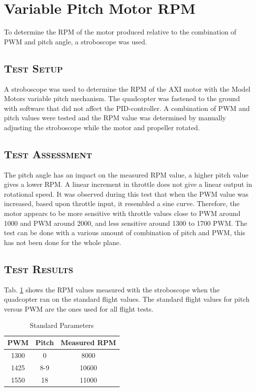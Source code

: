 
\section{Variable Pitch Motor RPM}
To determine the RPM of the motor produced relative to the combination of PWM and pitch angle, a stroboscope was used.

\subsection{\textsc{\medium Test Setup}}
A stroboscope was used to determine the RPM of the AXI motor with the Model Motors variable pitch mechanism. The quadcopter was fastened to the ground with software that did not affect the PID-controller. A combination of PWM and pitch values were tested and the RPM value was determined by manually adjusting the stroboscope while the motor and propeller rotated. 

\subsection{\textsc{\medium Test Assessment}}
The pitch angle has an impact on the measured RPM value, a higher pitch value gives a lower RPM. A linear increment in throttle does not give a linear output in rotational speed. It was observed during this test that when the PWM value was increased, based upon throttle input, it resembled a sine curve. Therefore, the motor appears to be more sensitive with throttle values close to PWM around 1000 and PWM around 2000, and less sensitive around 1300 to 1700 PWM. The test can be done with a various amount of combination of pitch and PWM, this has not been done for the whole plane.

\subsection{\textsc{\medium Test Results}}
Tab. \ref{tab:rpm1} shows the RPM values measured with the stroboscope when the quadcopter ran on the standard flight values. The standard flight values for pitch versus PWM are the ones used for all flight tests.
\begin{table}[H]
\caption{Standard Parameters}
\label{tab:rpm1}
\centering
\begin{tabular}{| c | c | c |} 
  \hline
 PWM & Pitch & Measured RPM\\
 \hline
 1300 & 0 & 8000 \\
 1425 & 8-9 & 10600 \\
 1550 & 18 & 11000 \\
 \hline
\end{tabular}
\end{table}\bigskip

